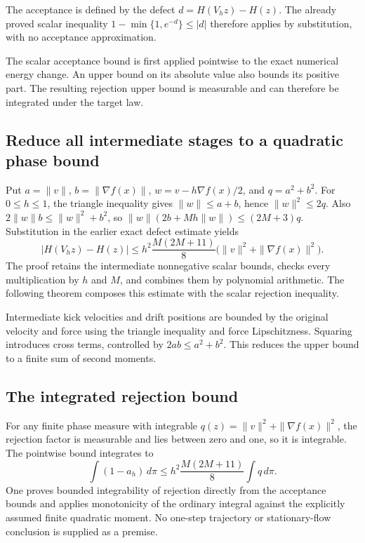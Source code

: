 \documentclass[11pt,a4paper]{report}
\begin{document}
The acceptance is defined by the defect \(d=H(V_hz)-H(z)\). The already proved scalar inequality \(1-\min\{1,e^{-d}\}\le |d|\) therefore applies by substitution, with no acceptance approximation.



The scalar acceptance bound is first applied pointwise to the exact numerical energy change. An upper bound on its absolute value also bounds its positive part. The resulting rejection upper bound is measurable and can therefore be integrated under the target law.

\subsection{\texorpdfstring{Reduce all intermediate stages to a quadratic phase bound}{Reduce all intermediate stages to a quadratic phase bound}}
\label{report-step-KineticLangevin-HamiltonianRejection-lean-2}


Put \(a=\|v\|\), \(b=\|\nabla f(x)\|\), \(w=v-h\nabla f(x)/2\), and \(q=a^2+b^2\). For \(0\le h\le1\), the triangle inequality gives \(\|w\|\le a+b\), hence \(\|w\|^2\le2q\). Also \(2\|w\|b\le\|w\|^2+b^2\), so \(\|w\|(2b+Mh\|w\|)\le(2M+3)q\). Substitution in the earlier exact defect estimate yields \[|H(V_hz)-H(z)|\le h^2\frac{M(2M+11)}8\bigl(\|v\|^2+\|\nabla f(x)\|^2\bigr).\] The proof retains the intermediate nonnegative scalar bounds, checks every multiplication by \(h\) and \(M\), and combines them by polynomial arithmetic. The following theorem composes this estimate with the scalar rejection inequality.



Intermediate kick velocities and drift positions are bounded by the original velocity and force using the triangle inequality and force Lipschitzness. Squaring introduces cross terms, controlled by \(2ab\le a^2+b^2\). This reduces the upper bound to a finite sum of second moments.

\subsection{\texorpdfstring{The integrated rejection bound}{The integrated rejection bound}}
\label{report-step-KineticLangevin-HamiltonianRejection-lean-3}


For any finite phase measure with integrable \(q(z)=\|v\|^2+\|\nabla f(x)\|^2\), the rejection factor is measurable and lies between zero and one, so it is integrable. The pointwise bound integrates to \[\int(1-a_h)\,d\pi\le h^2\frac{M(2M+11)}8\int q\,d\pi.\] One proves bounded integrability of rejection directly from the acceptance bounds and applies monotonicity of the ordinary integral against the explicitly assumed finite quadratic moment. No one-step trajectory or stationary-flow conclusion is supplied as a premise.
\end{document}
